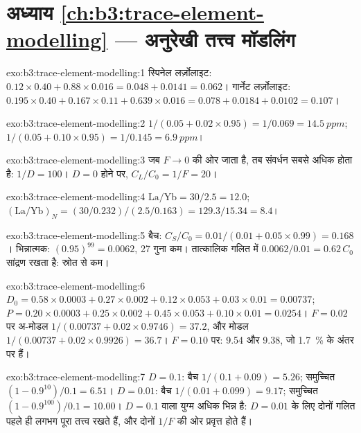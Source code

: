\section*{अध्याय \ref{ch:b3:trace-element-modelling} --- अनुरेखी तत्त्व मॉडलिंग}

\begin{solution}{exo:b3:trace-element-modelling:1}
स्पिनेल लर्ज़ोलाइट: $0.12\times0.40 + 0.88\times0.016 = 0.048 + 0.0141 =
0.062$। गार्नेट लर्ज़ोलाइट: $0.195\times0.40 + 0.167\times0.11 +
0.639\times0.016 = 0.078 + 0.0184 + 0.0102 = 0.107$।
\end{solution}

\begin{solution}{exo:b3:trace-element-modelling:2}
$1/(0.05 + 0.02\times0.95) = 1/0.069 = \qty{14.5}{ppm}$;
$1/(0.05 + 0.10\times0.95) = 1/0.145 = \qty{6.9}{ppm}$।
\end{solution}

\begin{solution}{exo:b3:trace-element-modelling:3}
जब $F \to 0$ की ओर जाता है, तब संवर्धन सबसे अधिक होता है: $1/D = 100$। $D = 0$ होने पर,
$C_L/C_0 = 1/F = 20$।
\end{solution}

\begin{solution}{exo:b3:trace-element-modelling:4}
$\mathrm{La/Yb} = 30/2.5 = 12.0$; $(\mathrm{La}/\mathrm{Yb})_N =
(30/0.232)/(2.5/0.163) = 129.3/15.34 = 8.4$।
\end{solution}

\begin{solution}{exo:b3:trace-element-modelling:5}
बैच: $C_S/C_0 = 0.01/(0.01 + 0.05\times0.99) = 0.168$। भिन्नात्मक:
$(0.95)^{99} = 0.0062$, 27 गुना कम। तात्कालिक गलित में
$0.0062/0.01 = 0.62\,C_0$ सांद्रण रखता है: स्रोत से कम।
\end{solution}

\begin{solution}{exo:b3:trace-element-modelling:6}
$D_0 = 0.58\times0.0003 + 0.27\times0.002 + 0.12\times0.053 + 0.03\times0.01
= 0.00737$; $P = 0.20\times0.0003 + 0.25\times0.002 + 0.45\times0.053 +
0.10\times0.01 = 0.0254$। $F = 0.02$ पर अ-मोडल $1/(0.00737 +
0.02\times0.9746) = 37.2$, और मोडल $1/(0.00737 + 0.02\times0.9926) = 36.7$।
$F = 0.10$ पर: 9.54 और 9.38, जो \qty{1.7}{\percent} के अंतर पर हैं।
\end{solution}

\begin{solution}{exo:b3:trace-element-modelling:7}
$D = 0.1$: बैच $1/(0.1 + 0.09) = 5.26$; समुच्चित $(1 - 0.9^{10})/0.1 =
6.51$। $D = 0.01$: बैच $1/(0.01 + 0.099) = 9.17$; समुच्चित
$(1 - 0.9^{100})/0.1 = 10.00$। $D = 0.1$ वाला युग्म अधिक भिन्न है:
$D = 0.01$ के लिए दोनों गलित पहले ही लगभग पूरा तत्त्व रखते हैं, और दोनों
$1/F$ की ओर प्रवृत्त होते हैं।
\end{solution}

